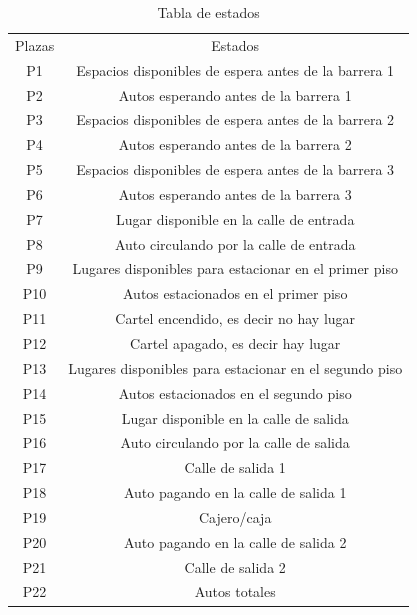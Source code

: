 \documentclass{article}
\begin{document}
	\begin{table}[H]
		\begin{center}
		\begin{tabular}{ |c|c| } 
 			\hline
 			Plazas & Estados \\ 
 			P1 & Espacios disponibles de espera antes de la barrera 1 \\
 			P2 & Autos esperando antes de la barrera 1 \\
 			P3 & Espacios disponibles de espera antes de la barrera 2 \\
 			P4 & Autos esperando antes de la barrera 2 \\
 			P5 & Espacios disponibles de espera antes de la barrera 3 \\
 			P6 & Autos esperando antes de la barrera 3 \\ 
 			P7 & Lugar disponible en la calle de entrada \\
 			P8 & Auto circulando por la calle de entrada \\
 			P9 & Lugares disponibles para estacionar en el primer piso \\
 			P10 & Autos estacionados en el primer piso \\
 			P11 & Cartel encendido, es decir no hay lugar \\
 			P12 & Cartel apagado, es decir hay lugar \\
 			P13 & Lugares disponibles para estacionar en el segundo piso \\
 			P14 & Autos estacionados en el segundo piso \\
 			P15 & Lugar disponible en la calle de salida \\
 			P16 & Auto circulando por la calle de salida\\
 			P17 & Calle de salida 1\\
 			P18 & Auto pagando en la calle de salida 1 \\
 			P19 & Cajero/caja \\ 
 			P20 & Auto pagando en la calle de salida 2 \\
 			P21 &  Calle de salida 2\\
 			P22 & Autos totales \\
 			\hline
		\end{tabular}
		\end{center}
		\caption{Tabla de estados}
		\label{table:estados}
	\end{table}
\end{document}
